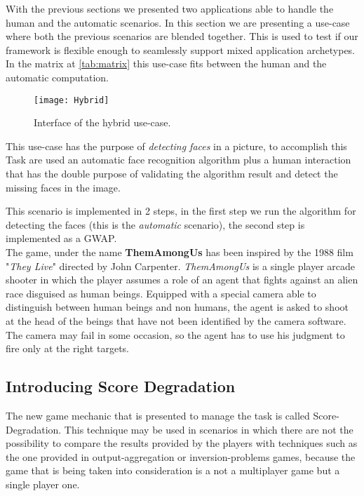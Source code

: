 
With the previous sections we presented two applications able to handle the
human and the automatic scenarios. In this section we are presenting a use-case
where both the previous scenarios are blended together. This is used to test
if our framework is flexible enough to seamlessly support mixed application
archetypes. In the matrix at \autoref{tab:matrix} this use-case fits between the
human and the automatic computation.

\begin{figure}[htb]
    \centering
    \texttt{[image: Hybrid]}
    \caption{Interface of the hybrid use-case.}
    \label{fig:Hybrid1}
\end{figure}

This use-case has the purpose of \emph{detecting faces} in a picture, to accomplish
this Task are used an automatic face recognition algorithm plus a human interaction
that has the double purpose of validating the algorithm result and detect the
missing faces in the image.

This scenario is implemented in 2 steps, in the first step we run the algorithm
for detecting the faces (this is the \emph{automatic} scenario), the second step
is implemented as a \ac{GWAP}.\\

The game, under the name \textbf{ThemAmongUs} has been inspired by the 1988
film "\emph{They Live}" directed by John Carpenter. \emph{ThemAmongUs} is a
single player arcade shooter in which the player assumes a role of an agent that
fights against an alien race disguised as human beings. Equipped with a special
camera able to distinguish between human beings and non humans, the agent is
asked to shoot at the head of the beings that have not been identified by the
camera software. The camera may fail in some occasion, so the agent has to use
his judgment to fire only at the right targets.

\subsection{Introducing Score Degradation}
The new game mechanic that is presented to manage the task is called
Score-Degradation. This technique may be used in scenarios in which there are not
the possibility to compare the results provided by the players with techniques
such as the one provided in output-aggregation or inversion-problems games,
because the game that is being taken into consideration is a not a multiplayer
game but a single player one.

